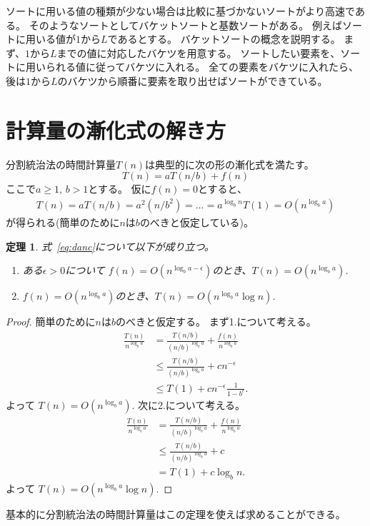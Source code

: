 \documentclass[a4paper,twoside,onecolumn,openany,article,10pt]{memoir}
\newtheorem{theorem}{定理}
\theoremstyle{remark}
\begin{document}
ソートに用いる値の種類が少ない場合は比較に基づかないソートがより高速である。
そのようなソートとしてバケットソートと基数ソートがある。
例えばソートに用いる値が$1$から$L$であるとする。
バケットソートの概念を説明する。
まず、$1$から$L$までの値に対応したバケツを用意する。
ソートしたい要素を、ソートに用いられる値に従ってバケツに入れる。
全ての要素をバケツに入れたら、後は$1$から$L$のバケツから順番に要素を取り出せばソートができている。

\section{計算量の漸化式の解き方}
分割統治法の時間計算量$T(n)$は典型的に次の形の漸化式を満たす。
\begin{equation}\label{eq:danc}
T(n) = aT(n/b) + f(n)
\end{equation}
ここで$a\ge 1,\, b>1$とする。
仮に$f(n)=0$とすると、
\begin{align*}
T(n) = aT(n/b) = a^2(n/b^2) = \dotsc = a^{\log_b n} T(1) = O(n^{\log_b a})
\end{align*}
が得られる(簡単のために$n$は$b$のべきと仮定している)。
\begin{theorem}
式~\eqref{eq:danc}について以下が成り立つ。
\begin{enumerate}
\item ある$\epsilon>0$について $f(n)=O(n^{\log_b a - \epsilon})$のとき、$T(n)=O(n^{\log_b a})$.
\item $f(n)=O(n^{\log_b a})$のとき、$T(n)=O(n^{\log_b a}\log n)$.
\end{enumerate}
\end{theorem}
\begin{proof}
簡単のために$n$は$b$のべきと仮定する。
まず1.について考える。
\begin{align*}
\frac{T(n)}{n^{\log_b a}} &= \frac{T(n/b)}{(n/b)^{\log_b a}} + \frac{f(n)}{n^{\log_b a}}\\
&\le \frac{T(n/b)}{(n/b)^{\log_b a}} + c n^{-\epsilon}\\
&\le T(1) + c n^{-\epsilon}\frac1{1-b^\epsilon}.
\end{align*}
よって $T(n)=O(n^{\log_b a})$.
次に2.について考える。
\begin{align*}
\frac{T(n)}{n^{\log_b a}} &= \frac{T(n/b)}{(n/b)^{\log_b a}} + \frac{f(n)}{n^{\log_b a}}\\
&\le \frac{T(n/b)}{(n/b)^{\log_b a}} + c\\
&= T(1) + c\log_b n.
\end{align*}
よって $T(n)=O(n^{\log_b a}\log n)$.
\end{proof}
基本的に分割統治法の時間計算量はこの定理を使えば求めることができる。
\end{document}
